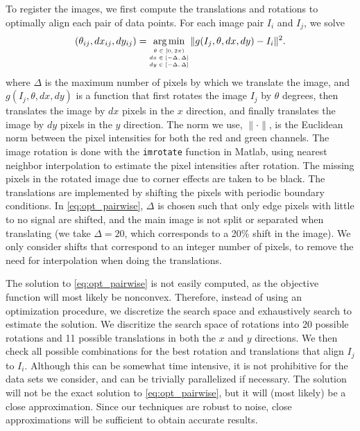 \documentclass{pnastwo}
\DeclareMathOperator*{\argmin}{arg\,min}
\begin{document}
\begin{article}
\begin{materials}
To register the images, we first compute the translations and rotations to optimally align each pair of data points. 
%
For each image pair $I_i$ and $I_j$, we solve
\begin{equation}\label{eq:opt_pairwise}
(\theta_{ij}, dx_{ij}, dy_{ij}) = \argmin_{
\scriptsize \begin{matrix}
\theta \in [0, 2\pi) \\ 
dx \in [-\Delta, \Delta]\\ 
dy \in [-\Delta, \Delta]
\end{matrix}
} \|g(I_j, \theta, dx, dy) - I_i \|^2.
\end{equation}
where $\Delta$ is the maximum number of pixels by which we translate the image, and $g(I_j, \theta, dx, dy)$ is a function that first rotates the image $I_j$ by $\theta$ degrees, then translates the image by $dx$ pixels in the $x$ direction, and finally translates the image by $dy$ pixels in the $y$ direction. 
%
The norm we use, $\| \cdot \|$, is the Euclidean norm between the pixel intensities for both the red and green channels.
%
The image rotation is done with the \texttt{imrotate} function in Matlab, using nearest neighbor interpolation to estimate the pixel intensities after rotation.%
%
The missing pixels in the rotated image due to corner effects are taken to be black.
%
The translations are implemented by shifting the pixels with periodic boundary conditions.
%
In \eqref{eq:opt_pairwise}, $\Delta$ is chosen such that only edge pixels with little to no signal are shifted, and the main image is not split or separated when translating (we take $\Delta=20$, which corresponds to a 20\% shift in the image).
%
We only consider shifts that correspond to an integer number of pixels, to remove the need for interpolation when doing the translations.  

The solution to \eqref{eq:opt_pairwise} is not easily computed, as the objective function will most likely be nonconvex.
%
Therefore, instead of using an optimization procedure, we discretize the search space and exhaustively search to estimate the solution.
%
We discritize the search space of rotations into 20 possible rotations %
and 11 possible translations in both the $x$ and $y$ directions. %
%
We then check all possible combinations for the best rotation and translations that align $I_j$ to $I_i$. 
%
Although this can be somewhat time intensive, it is not prohibitive for the data sets we consider, and can be trivially parallelized if necessary.
%
The solution will not be the exact solution to \eqref{eq:opt_pairwise}, but it will (most likely) be a close approximation.
%
Since our techniques are robust to noise, close approximations will be sufficient to obtain accurate results.


\end{materials}
\end{article}
\end{document}
